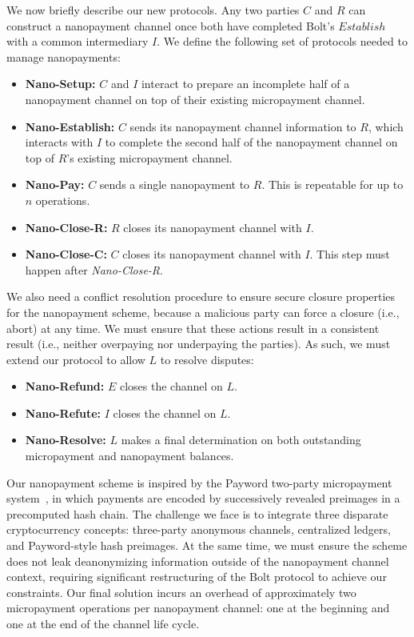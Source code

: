 We now briefly describe our new protocols.
Any two parties $C$ and $R$ can construct a nanopayment channel once both have completed Bolt's $Establish$ with a common intermediary $I$.
We define the following set of protocols needed to manage nanopayments:

\begin{itemize}[label={}]
\item \textbf{Nano-Setup:} $C$ and $I$ interact to prepare an incomplete half of a nanopayment channel on top of their existing micropayment channel.
\item \textbf{Nano-Establish:} $C$ sends its nanopayment channel information to $R$, which interacts with $I$ to complete the second half of the nanopayment channel on top of $R$'s existing micropayment channel.
\item \textbf{Nano-Pay:} $C$ sends a single nanopayment to $R$.
This is repeatable for up to $n$ operations.
\item \textbf{Nano-Close-R:} $R$ closes its nanopayment channel with $I$.
\item \textbf{Nano-Close-C:} $C$ closes its nanopayment channel with $I$.
This step must happen after \emph{Nano-Close-R}.
\end{itemize}

We also need a conflict resolution procedure to ensure secure closure properties for the nanopayment scheme, because a malicious party can force a closure (i.e., abort) at any time.
We must ensure that these actions result in a consistent result (i.e., neither overpaying nor underpaying the parties).
As such, we must extend our protocol to allow $L$ to resolve disputes:

\begin{itemize}[label={}]
\item \textbf{Nano-Refund:} $E$ closes the channel on $L$.
\item \textbf{Nano-Refute:} $I$ closes the channel on $L$.
\item \textbf{Nano-Resolve:} $L$ makes a final determination on both outstanding micropayment
  and nanopayment balances.
\end{itemize}

Our nanopayment scheme is inspired by the Payword two-party micropayment system~\cite{rivest1996payword}, in which payments are encoded by successively revealed preimages in a precomputed hash chain.
The challenge we face is to integrate three disparate cryptocurrency concepts: three-party anonymous channels, centralized ledgers, and Payword-style hash preimages.
At the same time, we must ensure the scheme does not leak deanonymizing information outside of the nanopayment channel context, requiring significant restructuring of the Bolt protocol to achieve our constraints.
Our final solution incurs an overhead of approximately two micropayment operations per nanopayment channel: one at the beginning and one at the end of the channel life cycle.

